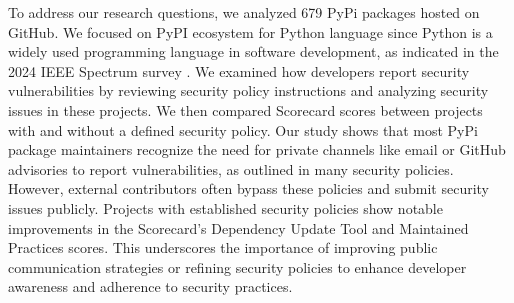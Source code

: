 To address our research questions, we analyzed 679 PyPi packages hosted on GitHub. We focused on PyPI ecosystem for Python language since Python is a widely used programming language in software development, as indicated in the 2024 IEEE Spectrum survey \cite{TopProgrammingLanguage:online}. We examined how developers report security vulnerabilities by reviewing security policy instructions and analyzing security issues in these projects. We then compared Scorecard scores between projects with and without a defined security policy. Our study shows that most PyPi package maintainers recognize the need for private channels like email or GitHub advisories to report vulnerabilities, as outlined in many security policies. However, external contributors often bypass these policies and submit security issues publicly. Projects with established security policies show notable improvements in the Scorecard's Dependency Update Tool and Maintained Practices scores. This underscores the importance of improving public communication strategies or refining security policies to enhance developer awareness and adherence to security practices.




